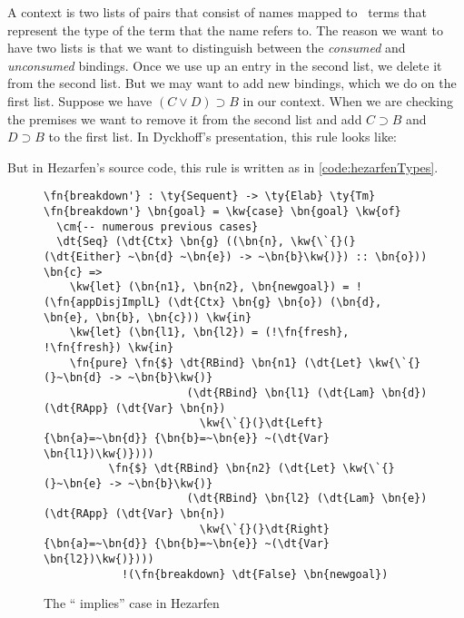 A context is two lists of pairs that consist of names mapped to \Raw\ terms
that represent the type of the term that the name refers to.
The reason we want to have two lists is that we want to distinguish between the
\emph{consumed} and \emph{unconsumed} bindings. Once we use up an entry in the second list,
we delete it from the second list. But we may want to add new bindings, which
we do on the first list. Suppose we have $(C \vee D) \supset B$ in our context.
When we are checking the premises we want to remove it from the second list
and add $C \supset B$ and $D \supset B$ to the first list. In Dyckhoff's
presentation, this rule looks like:

\begin{prooftree}
\end{prooftree}
\vspace{\baselineskip}

But in Hezarfen's source code, this rule is written as in \autoref{code:hezarfenTypes}.

\begin{figure}[ht]
\caption{The `` implies'' case in Hezarfen}
\label{code:hezarfenTypes}
\begin{Verbatim}[framesep=2mm, label=\footnotesize{\normalfont{Idris}}, labelposition=topline]
\fn{breakdown'} : \ty{Sequent} -> \ty{Elab} \ty{Tm}
\fn{breakdown'} \bn{goal} = \kw{case} \bn{goal} \kw{of}
  \cm{-- numerous previous cases}
  \dt{Seq} (\dt{Ctx} \bn{g} ((\bn{n}, \kw{\`{}(}(\dt{Either} ~\bn{d} ~\bn{e}) -> ~\bn{b}\kw{)}) :: \bn{o})) \bn{c} =>
    \kw{let} (\bn{n1}, \bn{n2}, \bn{newgoal}) = !(\fn{appDisjImplL} (\dt{Ctx} \bn{g} \bn{o}) (\bn{d}, \bn{e}, \bn{b}, \bn{c})) \kw{in}
    \kw{let} (\bn{l1}, \bn{l2}) = (!\fn{fresh}, !\fn{fresh}) \kw{in}
    \fn{pure} \fn{$} \dt{RBind} \bn{n1} (\dt{Let} \kw{\`{}(}~\bn{d} -> ~\bn{b}\kw{)}
                      (\dt{RBind} \bn{l1} (\dt{Lam} \bn{d}) (\dt{RApp} (\dt{Var} \bn{n})
                        \kw{\`{}(}\dt{Left} {\bn{a}=~\bn{d}} {\bn{b}=~\bn{e}} ~(\dt{Var} \bn{l1})\kw{)})))
          \fn{$} \dt{RBind} \bn{n2} (\dt{Let} \kw{\`{}(}~\bn{e} -> ~\bn{b}\kw{)}
                      (\dt{RBind} \bn{l2} (\dt{Lam} \bn{e}) (\dt{RApp} (\dt{Var} \bn{n})
                        \kw{\`{}(}\dt{Right} {\bn{a}=~\bn{d}} {\bn{b}=~\bn{e}} ~(\dt{Var} \bn{l2})\kw{)})))
            !(\fn{breakdown} \dt{False} \bn{newgoal})
\end{Verbatim}
\end{figure}

